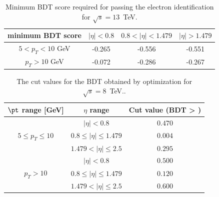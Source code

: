 

\begin{table}[h]
    \centering
    \begin{tabular}{c|c c c}                                                              
\hline %
minimum BDT score    &  $|\eta| < 0.8 $ & $0.8 < |\eta| < 1.479$        & $|\eta| > 1.479$      \\
\hline %
$ 5 < p_T < 10 $ GeV &  -0.265          & -0.556                & -0.551                \\
$p_T > 10$ GeV       &  -0.072          & -0.286                & -0.267                \\
\hline %
\hline %
     \end{tabular}
\s%
    \caption{Minimum BDT score required for passing the electron identification for $\sqrt{s} = 13$~TeV.}
    \label{tab:ele_ID_WP}
\end{table}
\begin{table}[htbp]
\caption{The cut values for the BDT obtained by optimization  for $\sqrt{s} = 8$~TeV..}
\begin{center}
\begin{tabular}{c c  c}
\toprule
$\pt$ range [GeV]& $\eta$ range & Cut value (BDT > ) \\  \midrule
\multicolumn{ 1}{c}{} & $|\eta| < 0.8$ &  $ 0.470$ \\ %
\multicolumn{ 1}{c}{$5 \leq p_T \leq 10$} & $0.8 \leq |\eta| \leq 1.479$ &  $ 0.004$ \\ %
\multicolumn{ 1}{c}{} & $1.479 < |\eta| \leq 2.5$ &  $ 0.295$ \\ \midrule %
\multicolumn{ 1}{c}{} & $|\eta| < 0.8$ &  $ 0.500$ \\ %
\multicolumn{ 1}{c}{$ p_T > 10$} & $0.8 \leq |\eta| \leq 1.479$ &  $ 0.120$ \\ %
\multicolumn{ 1}{c}{} & $1.479 < |\eta| \leq 2.5$ &  $ 0.600$ \\ 
\bottomrule
\end{tabular}
\end{center}
\label{tab:bdt_cuts}
\end{table}
